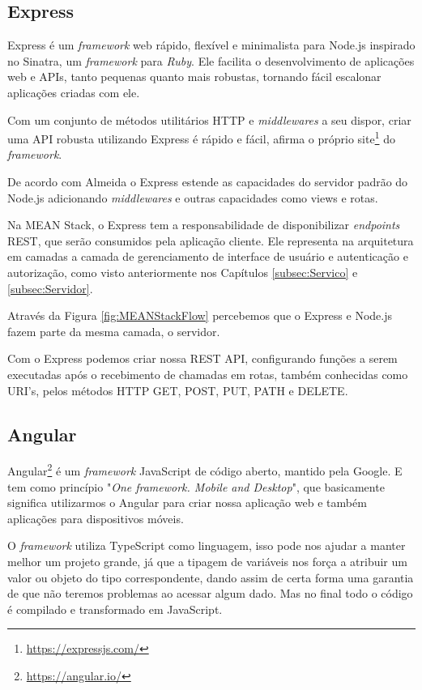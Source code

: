 \documentclass[
	12pt,				%
	openright,			%
	twoside,			%
	a4paper,			%
	english,			%
	brazil				%
	]{abntex2}
\begin{document}
\subsection{Express}

Express é um \textit{framework} web rápido, flexível e minimalista para Node.js inspirado no Sinatra, um \textit{framework} para \textit{Ruby}. Ele facilita o desenvolvimento de aplicações web e APIs, tanto pequenas quanto mais robustas, tornando fácil escalonar aplicações criadas com ele.

Com um conjunto de métodos utilitários HTTP e \textit{middlewares} a seu dispor, criar uma API robusta utilizando Express é rápido e fácil, afirma o próprio site\footnote{\url{https://expressjs.com/}} do \textit{framework}.

De acordo com Almeida\cite{flavioalmeida_meanstack} o Express estende as capacidades do servidor padrão do Node.js adicionando \textit{middlewares} e outras capacidades como views e rotas.

Na MEAN Stack, o Express tem a responsabilidade de disponibilizar \textit{endpoints} REST, que serão consumidos pela aplicação cliente. Ele representa na arquitetura em camadas a camada de gerenciamento de interface de usuário e autenticação e autorização, como visto anteriormente nos Capítulos \ref{subsec:Servico} e \ref{subsec:Servidor}.

Através da Figura \ref{fig:MEANStackFlow} percebemos que o Express e Node.js fazem parte da mesma camada, o servidor.

Com o Express podemos criar nossa REST API, configurando funções a serem executadas após o recebimento de chamadas em rotas, também conhecidas como URI's, pelos métodos HTTP GET, POST, PUT, PATH e DELETE.

\subsection{Angular}

Angular\footnote{\url{https://angular.io/}} é um \textit{framework} JavaScript de código aberto, mantido pela Google. E tem como princípio "\textit{One framework. Mobile and Desktop}", que basicamente significa utilizarmos o Angular para criar nossa aplicação web e também aplicações para dispositivos móveis.

O \textit{framework} utiliza TypeScript como linguagem, isso pode nos ajudar a manter melhor um projeto grande, já que a tipagem de variáveis nos força a atribuir um valor ou objeto do tipo correspondente, dando assim de certa forma uma garantia de que não teremos problemas ao acessar algum dado. Mas no final todo o código é compilado e transformado em JavaScript.
\end{document}
